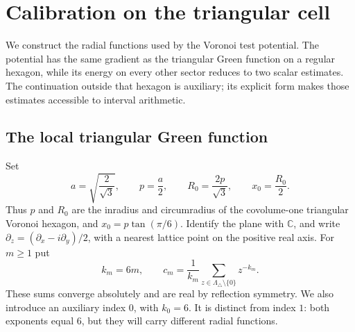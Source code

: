 \section{Calibration on the triangular cell}\label{cal:section}\label{sec:calibration}

We construct the radial functions used by the Voronoi test potential.
The potential has the same gradient as the triangular Green function
on a regular hexagon, while its energy on every other sector reduces
to two scalar estimates.  The continuation outside that hexagon is
auxiliary; its explicit form makes those estimates accessible to
interval arithmetic.

\subsection{The local triangular Green function}
Set
\begin{equation}\label{cal:geometry}
 a=\sqrt{\frac{2}{\sqrt3}},\qquad p=\frac a2,\qquad
 R_0=\frac{2p}{\sqrt3},\qquad x_0=\frac{R_0}{2}.
\end{equation}
Thus $p$ and $R_0$ are the inradius and circumradius of the covolume-one
triangular Voronoi hexagon, and $x_0=p\tan(\pi/6)$.
Identify the plane with $\mathbb C$, and write
$\partial_z=(\partial_x-i\partial_y)/2$, with a nearest lattice point on the
positive real axis.  For $m\ge1$ put
\begin{equation}\label{cal:coefficients}
 k_m=6m,\qquad
 c_m=\frac1{k_m}\sum_{z\in\Lambda_\triangle\setminus\{0\}}z^{-k_m}.
\end{equation}
These sums converge absolutely and are real by reflection symmetry.
We also introduce an auxiliary index $0$, with $k_0=6$.
It is distinct from index $1$: both exponents equal $6$, but they will
carry different radial functions.

